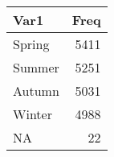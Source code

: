 
\begin{tabular}[t]{lr}
\toprule
Var1 & Freq\\
\midrule
Spring & 5411\\
Summer & 5251\\
Autumn & 5031\\
Winter & 4988\\
NA & 22\\
\bottomrule
\end{tabular}
